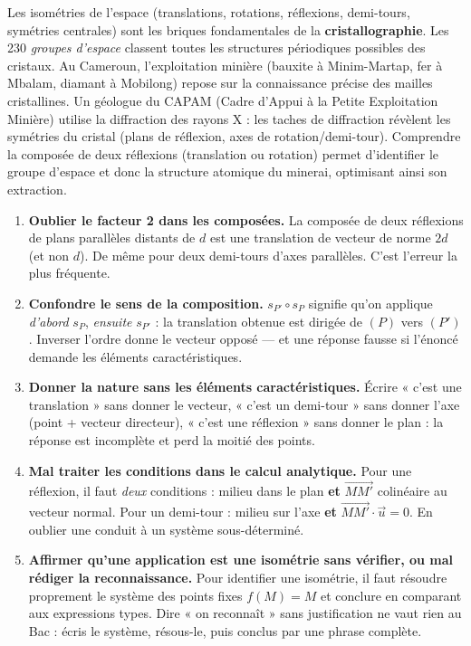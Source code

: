 \documentclass[11pt]{article}
\begin{document}
\begin{savaistu}
Les isométries de l'espace (translations, rotations, réflexions, demi-tours, symétries centrales) sont les briques fondamentales de la \textbf{cristallographie}. Les 230 \emph{groupes d'espace} classent toutes les structures périodiques possibles des cristaux. Au Cameroun, l'exploitation minière (bauxite à Minim-Martap, fer à Mbalam, diamant à Mobilong) repose sur la connaissance précise des mailles cristallines. Un géologue du CAPAM (Cadre d'Appui à la Petite Exploitation Minière) utilise la diffraction des rayons X : les taches de diffraction révèlent les symétries du cristal (plans de réflexion, axes de rotation/demi-tour). Comprendre la composée de deux réflexions (translation ou rotation) permet d'identifier le groupe d'espace et donc la structure atomique du minerai, optimisant ainsi son extraction.
\end{savaistu}

\begin{attention}
\begin{enumerate}
\item \textbf{Oublier le facteur 2 dans les composées.} La composée de deux réflexions de plans parallèles distants de $d$ est une translation de vecteur de norme $2d$ (et non $d$). De même pour deux demi-tours d'axes parallèles. C'est l'erreur la plus fréquente.
\item \textbf{Confondre le sens de la composition.} $s_{P'}\circ s_{P}$ signifie qu'on applique \emph{d'abord} $s_{P}$, \emph{ensuite} $s_{P'}$ : la translation obtenue est dirigée de $(P)$ vers $(P')$. Inverser l'ordre donne le vecteur opposé — et une réponse fausse si l'énoncé demande les éléments caractéristiques.
\item \textbf{Donner la nature sans les éléments caractéristiques.} Écrire « c'est une translation » sans donner le vecteur, « c'est un demi-tour » sans donner l'axe (point + vecteur directeur), « c'est une réflexion » sans donner le plan : la réponse est incomplète et perd la moitié des points.
\item \textbf{Mal traiter les conditions dans le calcul analytique.} Pour une réflexion, il faut \emph{deux} conditions : milieu dans le plan \textbf{et} $\overrightarrow{MM'}$ colinéaire au vecteur normal. Pour un demi-tour : milieu sur l'axe \textbf{et} $\overrightarrow{MM'}\cdot\vec{u}=0$. En oublier une conduit à un système sous-déterminé.
\item \textbf{Affirmer qu'une application est une isométrie sans vérifier, ou mal rédiger la reconnaissance.} Pour identifier une isométrie, il faut résoudre proprement le système des points fixes $f(M)=M$ et conclure en comparant aux expressions types. Dire « on reconnaît » sans justification ne vaut rien au Bac : écris le système, résous-le, puis conclus par une phrase complète.
\end{enumerate}
\end{attention}
\end{document}
